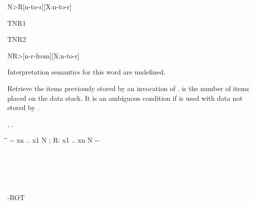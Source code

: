 \begin{worddef*}[NtoR]{}{N>R}[n-to-r][X:n-to-r]
	\begin{testing}
		\word{:} TNR1    \word{;} \\

		\word{:} TNR2      \word{;} \\
	\end{testing}
\end{worddef*}


\begin{worddef*}[NRfrom]{}{NR>}[n-r-from][X:n-to-r]

\interpret
	Interpretation semantics for this word are undefined.

\execute {} 

	Retrieve the items previously stored by an invocation of .
	 is the number of items placed on the data stack. It is an
	ambiguous condition if  is used with data not stored by
	. 

\see {}, .

	\begin{implement}

		\begin{tabbing}
		\tab \= \tab \= \tab[11] \= \kill
		\word{:}   -{}- xn .. x1 N ; R: x1 .. xn N -{}- \\
		  \+ \\
			\word{Rfrom}     \\
			 \+ \\
				 \- \\
			 \+ \\
				\word{Rfrom}    -ROT \\
				 \- \\
			 \\
			 \- \\
		\word{;}
		\end{tabbing}
	\end{implement}
\end{worddef*}



